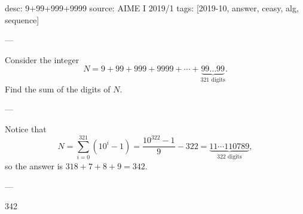 desc: 9+99+999+9999
source: AIME I 2019/1
tags: [2019-10, answer, ceasy, alg, sequence]

---

Consider the integer \[N=9+99+999+9999+\cdots+\underbrace{99\ldots 99}_\text{321 digits}.\]
Find the sum of the digits of $N$.

---

Notice that \[N=\sum_{i=0}^{321}(10^i-1)=\frac{10^{322}-1}9-322=\underbrace{11\cdots 110789}_\text{322 digits},\]
so the answer is $318+7+8+9=342$.

---

342
